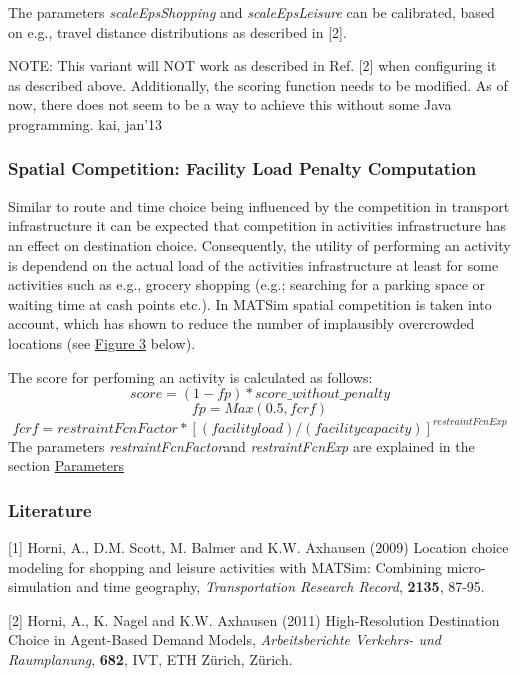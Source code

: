 \documentclass[a4paper,11pt]{report}
\begin{document}
The parameters \emph{scaleEpsShopping }and \emph{scaleEpsLeisure }can be calibrated, based on e.g., travel distance distributions as described in [2].

NOTE: This  variant will NOT work as described in Ref. [2] when configuring it as  described above. Additionally, the scoring function needs to be  modified. As of now, there does not seem to be a way to achieve  this without some Java programming. kai, jan'13

\subsubsection{\textbf{Spatial Competition: Facility Load Penalty Computation}}

Similar to route and time choice being influenced by  the competition in transport infrastructure it can be expected that  competition in activities infrastructure has an effect on destination  choice. Consequently, the utility of performing an activity is dependend  on the actual load of the activities infrastructure at least for some  activities such as e.g., grocery shopping (e.g.; searching for a parking  space or waiting time at cash points etc.). In MATSim spatial  competition is taken into account, which has shown to reduce the number  of implausibly overcrowded locations (see \hyperlink{Figure3}{Figure 3} below).

The score for perfoming an activity is calculated as follows:
\[
score = (1- fp) * score\_without\_penalty
\]
\[
fp = Max(0.5, fcrf)
\]
\[
fcrf = restraintFcnFactor * [(facility load) / (facility capacity)]^{restraintFcnExp}
\]
The parameters \emph{restraintFcnFactor}and \emph{restraintFcnExp }are explained in the section \hyperlink{parameters}{Parameters}


\subsubsection{\textbf{Literature}}

[1] Horni, A., D.M. Scott, M. Balmer and K.W. Axhausen (2009)  Location choice modeling for shopping and leisure activities with  MATSim: Combining micro-simulation and time geography, \emph{Transportation Research Record}, \textbf{2135}, 87-95.

[2] Horni, A., K. Nagel and K.W. Axhausen (2011) High-Resolution Destination Choice in Agent-Based Demand Models, \emph{Arbeitsberichte Verkehrs- und Raumplanung}, \textbf{682}, IVT, ETH Zürich, Zürich.
\end{document}
